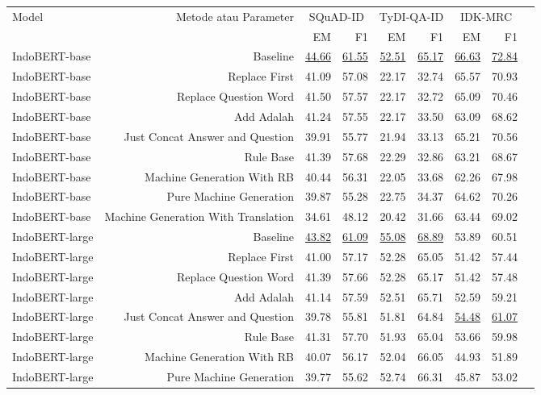\begin{table}[H]\centering
\scriptsize
\begin{tabular}{lrrrrrrrr}\toprule
\multirow{2}{*}{Model} &\multirow{2}{*}{Metode atau Parameter} &\multicolumn{2}{c}{SQuAD-ID} &\multicolumn{2}{c}{TyDI-QA-ID} &\multicolumn{2}{c}{IDK-MRC} \\\cmidrule{3-8}
& &EM &F1 &EM &F1 &EM &F1 \\\midrule
IndoBERT-base &Baseline &\underline{44.66} &\underline{61.55} &\underline{52.51} &\underline{65.17} &\underline{66.63} &\underline{72.84} \\
IndoBERT-base &Replace First &41.09 &57.08 &22.17 &32.74 &65.57 &70.93 \\
IndoBERT-base &Replace Question Word &41.50 &57.57 &22.17 &32.72 &65.09 &70.46 \\
IndoBERT-base &Add Adalah &41.24 &57.55 &22.17 &33.50 &63.09 &68.62 \\
IndoBERT-base &Just Concat Answer and Question &39.91 &55.77 &21.94 &33.13 &65.21 &70.56 \\
IndoBERT-base &Rule Base &41.39 &57.68 &22.29 &32.86 &63.21 &68.67 \\
IndoBERT-base &Machine Generation With RB &40.44 &56.31 & 22.05 &33.68 &62.26 &67.98 \\
IndoBERT-base &Pure Machine Generation &39.87 &55.28 &22.75 &34.37 &64.62 &70.26 \\
IndoBERT-base &Machine Generation With Translation &34.61 &48.12 &20.42 &31.66 &63.44 &69.02 \\
\hline
IndoBERT-large &Baseline &\underline{43.82} &\underline{61.09} &\underline{55.08} &\underline{68.89} &53.89 &60.51 \\
IndoBERT-large &Replace First &41.00 &57.17 &52.28 &65.05 &51.42 &57.44 \\
IndoBERT-large &Replace Question Word &41.39 &57.66 &52.28 &65.17 &51.42 &57.48 \\
IndoBERT-large &Add Adalah &41.14 &57.59 &52.51 &65.71 &52.59 &59.21 \\
IndoBERT-large &Just Concat Answer and Question &39.78 &55.81 &51.81 &64.84 &\underline{54.48} &\underline{61.07} \\
IndoBERT-large &Rule Base &41.31 &57.70 &51.93 &65.04 &53.66 &59.98 \\
IndoBERT-large &Machine Generation With RB &40.07 &56.17 &52.04 &66.05 &44.93 &51.89 \\
IndoBERT-large &Pure Machine Generation &39.77 &55.62 &52.74 &66.31 &45.87 &53.02 \\

\end{tabular}
\end{table}
